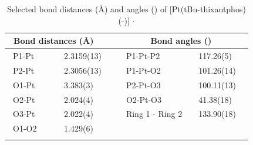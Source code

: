\begin{table}[ht]
\caption[Selected bond distances (\AA) and angles (\degrees) of [Pt(tBu-thixantphos)(\hapto{}-){]} $\cdot{}$ ]{Selected bond distances (\AA) and angles (\degrees) of [Pt(tBu-thixantphos)(\hapto{}-){]} $\cdot{}$ } 
\vspace{1em}
\label{table:crystalPtdioxygen:lengths}
\small
\begin{center}
\begin{tabular}{l l l l}
	\toprule
	\multicolumn{2}{l}{\bfseries{~Bond distances (\si{\angstrom})}} & \multicolumn{2}{c}{\bfseries{Bond angles (\degrees)}} \\
	\midrule		
	~P1-Pt		~~&~~2.3159(13)~~	&~~P1-Pt-P2			&~~117.26(5)~~	\\	
	~P2-Pt		~~&~~2.3056(13)~~	&~~P1-Pt-O2			&~~101.26(14)~~	\\
	~O1-Pt		~~&~~3.383(3)~~	&~~P2-Pt-O3			&~~100.11(13)~~	\\
	~O2-Pt		~~&~~2.024(4)~~	&~~O2-Pt-O3			&~~41.38(18)~~	\\
	~O3-Pt		~~&~~2.022(4)~~	&~~Ring 1 - Ring 2		&~~133.90(18)~~	\\
	~O1-O2		~~&~~1.429(6)~~	&~~					&~~		~~		\\
	\bottomrule{}
\end{tabular}
\end{center}
\end{table}

